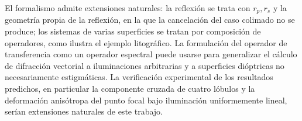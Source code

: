 El formalismo admite extensiones naturales: la reflexión se trata con $r_p,r_s$ y la geometría propia de la reflexión, en la que la cancelación del caso colimado no se produce; los sistemas de varias superficies se
tratan por composición de operadores, como ilustra el ejemplo litográfico. La
formulación del operador de transferencia como un operador espectral puede
usarse para generalizar el cálculo de difracción vectorial a iluminaciones
arbitrarias y a superficies dióptricas no necesariamente estigmáticas. La
verificación experimental de los resultados predichos, en particular la
componente cruzada de cuatro lóbulos y la deformación anisótropa del punto
focal bajo iluminación uniformemente lineal, serían extensiones naturales de este trabajo.
